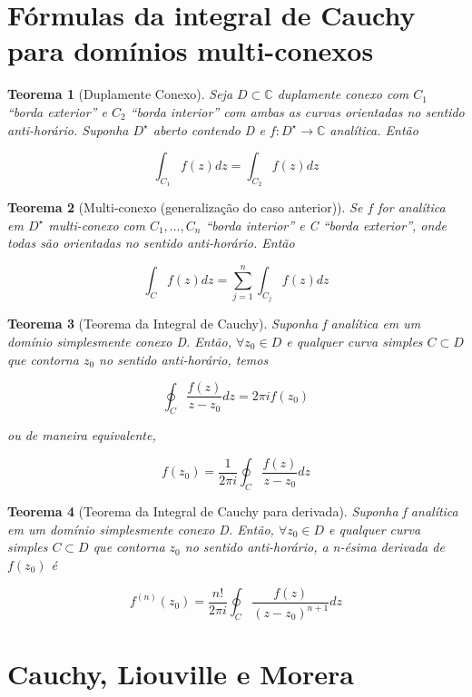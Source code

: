 \documentclass{article}
\newtheorem{theorem}{Teorema}
\begin{document}
\section*{Fórmulas da integral de Cauchy para domínios multi-conexos}
\label{s6}

\begin{theorem}[Duplamente Conexo]
Seja $D \subset \mathbb{C}$ duplamente conexo com $C_1$ ``borda exterior'' e $C_2$ ``borda interior'' com ambas as curvas orientadas no sentido anti-horário. Suponha $D^\star$ aberto contendo D e $f: D^\star \rightarrow \mathbb{C}$ analítica. Então

$$\int_{C_1} f(z) d z = \int_{C_2} f(z) d z$$
\end{theorem}

\begin{theorem}[Multi-conexo (generalização do caso anterior)]
Se $f$ for analítica em $D^\star$ multi-conexo com $C_1, \ldots, C_n$ ``borda interior'' e C ``borda exterior'', onde todas são orientadas no sentido anti-horário. Então

$$\int_C f(z) d z = \sum_{j = 1}^n \int_{C_j} f(z) d z$$
\end{theorem}

\begin{theorem}[Teorema da Integral de Cauchy]
Suponha f analítica em um domínio simplesmente conexo D. Então, $\forall z_0 \in D$ e qualquer curva simples $C \subset D$ que contorna $z_0$ no sentido anti-horário, temos

$$\oint_C \frac{f(z)}{z - z_0} dz = 2 \pi i f(z_0)$$

ou de maneira equivalente,

$$f(z_0) = \frac{1}{2 \pi i} \oint_C \frac{f(z)}{z - z_0} d z$$
\end{theorem}

\begin{theorem}[Teorema da Integral de Cauchy para derivada]
Suponha f analítica em um domínio simplesmente conexo D. Então, $\forall z_0 \in D$ e qualquer curva simples $C \subset D$ que contorna $z_0$ no sentido anti-horário, a n-ésima derivada de $f(z_0)$ é

$$f^{(n)}(z_0) = \frac{n!}{2 \pi i} \oint_C \frac{f(z)}{(z - z_0)^{n + 1}} d z$$
\end{theorem}

\section*{Cauchy, Liouville e Morera}
\label{s7}
\end{document}
